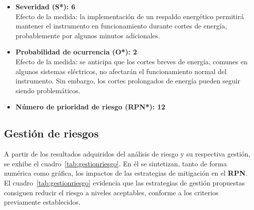 \begin{description}
\begin{itemize}
		\item \textbf{Severidad (S*): 6} \\
		Efecto de la medida: la implementación de un respaldo energético permitirá mantener el instrumento en funcionamiento durante cortes de energía, probablemente por algunos minutos adicionales.
		
		\item \textbf{Probabilidad de ocurrencia (O*): 2} \\
		Efecto de la medida: se anticipa que los cortes breves de energía, comunes en algunos sistemas eléctricos, no afectarán el funcionamiento normal del instrumento. Sin embargo, los cortes prolongados de energía pueden seguir siendo problemáticos.
		
		\item \textbf{Número de prioridad de riesgo (RPN*): 12}
	\end{itemize}
	
	
\end{description}





\subsection{Gestión de riesgos}


A partir de los resultados adquiridos del análisis de riesgo y su respectiva gestión, se exhibe el cuadro~\ref{tab:gestionriesgo}. En él se sintetizan, tanto de forma numérica como gráfica, los impactos de las estrategias de mitigación en el \textbf{RPN}. El cuadro~\ref{tab:gestionriesgo} evidencia que las estrategias de gestión propuestas consiguen reducir el riesgo a niveles aceptables, conforme a los criterios previamente establecidos.


